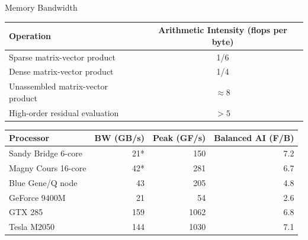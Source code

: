 \documentclass{beamer}
\begin{document}
\begin{frame}{Memory Bandwidth}
  \begin{tabular}{lc}
    \toprule
    Operation                         & Arithmetic Intensity (flops per byte) \\
    \midrule
    Sparse matrix-vector product      & 1/6                  \\
    Dense matrix-vector product       & 1/4                  \\
    Unassembled matrix-vector product & $\approx 8$          \\
    High-order residual evaluation    & $> 5$                \\
    \bottomrule
  \end{tabular}
  \bigskip
  \begin{tabular}{lrrr}
    \toprule
    Processor           & BW (GB/s) & Peak (GF/s) & Balanced AI (F/B) \\
    \midrule
    Sandy Bridge 6-core & 21*       & 150         & 7.2                 \\
    Magny Cours 16-core & 42*       & 281         & 6.7                 \\
    Blue Gene/Q node    & 43        & 205         & 4.8                 \\
    GeForce 9400M       & 21        & 54          & 2.6                 \\
    GTX 285             & 159       & 1062        & 6.8                 \\
    Tesla M2050         & 144       & 1030        & 7.1                 \\
    \bottomrule
  \end{tabular}
\end{frame}
\end{document}
